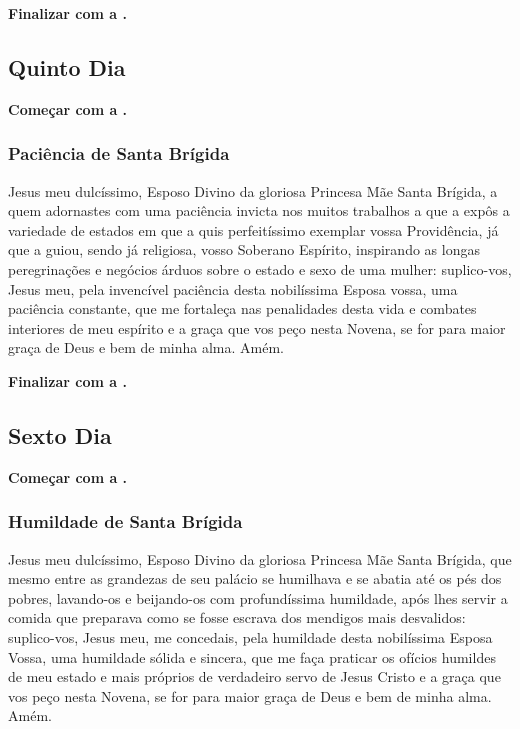 \documentclass[a4paper,12pt]{extarticle} \usepackage[utf8]{inputenc}
\begin{document}
\noindent
\textbf{Finalizar com a .}


\subsection{Quinto Dia}

\noindent
\textbf{Começar com a .}

\subsubsection*{Paciência de Santa Brígida}

Jesus meu dulcíssimo, Esposo Divino da gloriosa Princesa Mãe Santa Brígida, a quem adornastes com uma paciência invicta nos muitos trabalhos a que a expôs a variedade de estados em que a quis perfeitíssimo exemplar vossa Providência, já que a guiou, sendo já religiosa, vosso Soberano Espírito, inspirando as longas peregrinações e negócios árduos sobre o estado e sexo de uma mulher: suplico-vos, Jesus meu, pela invencível paciência desta nobilíssima Esposa vossa, uma paciência constante, que me fortaleça nas penalidades desta vida e combates interiores de meu espírito e a graça que vos peço nesta Novena, se for para maior graça de Deus e bem de minha alma. Amém.

\noindent
\textbf{Finalizar com a .}


\subsection{Sexto Dia}

\noindent
\textbf{Começar com a .}

\subsubsection*{Humildade de Santa Brígida}

Jesus meu dulcíssimo, Esposo Divino da gloriosa Princesa Mãe Santa Brígida, que mesmo entre as grandezas de seu palácio se humilhava e se abatia até os pés dos pobres, lavando-os e beijando-os com profundíssima humildade, após lhes servir a comida que preparava como se fosse escrava dos mendigos mais desvalidos: suplico-vos, Jesus meu, me concedais, pela humildade desta nobilíssima Esposa Vossa, uma humildade sólida e sincera, que me faça praticar os ofícios humildes de meu estado e mais próprios de verdadeiro servo de Jesus Cristo e a graça que vos peço nesta Novena, se for para maior graça de Deus e bem de minha alma. Amém.
\end{document}
